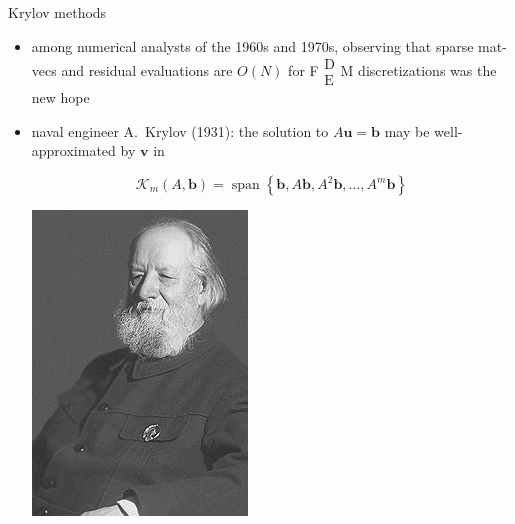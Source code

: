 \documentclass[hide notes,intlimits,usenames,dvipsnames]{beamer}
\newcommand{\bb}{\mathbf{b}}
\newcommand{\bu}{\mathbf{u}}
\newcommand{\bv}{\mathbf{v}}
\newcommand{\FM}{F$\begin{smallmatrix} \text{D} \\ \text{E} \end{smallmatrix}$M\xspace}
\begin{document}
\begin{frame}{Krylov methods}
\begin{itemize}
\item among numerical analysts of the 1960s and 1970s, observing that sparse mat-vecs and residual evaluations are $O(N)$ for \FM discretizations was the new hope
\item \begin{minipage}[t]{0.7\textwidth}
naval engineer A.~Krylov (1931): the solution to $A\bu=\bb$ may be well-approximated by $\bv$ in

\vspace{-4mm}
$$\mathcal{K}_m(A,\bb) = \operatorname{span}\left\{\bb,A\bb,A^2\bb,\dots,A^m\bb\right\}$$
\end{minipage} \quad
\begin{minipage}[t]{0.18\textwidth}
\vspace{-3mm}

\includegraphics[width=\textwidth]{figs/krylov}
\end{minipage}


\end{itemize}
\end{frame}
\end{document}
